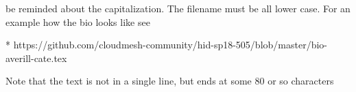 be reminded about the capitalization. The filename must be all lower
case. For an example how the bio looks like see

* https://github.com/cloudmesh-community/hid-sp18-505/blob/master/bio-averill-cate.tex

Note that the text is not in a single line, but ends at some 80 or so characters
